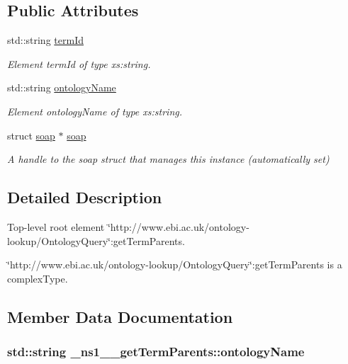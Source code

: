 \subsection*{Public Attributes}
\begin{DoxyCompactItemize}
\item 
std::string \hyperlink{class__ns1____getTermParents_aa94fee4393ebbdb785e2bfca3eca1cb7}{termId}
\begin{DoxyCompactList}\small\item\em Element termId of type xs:string. \end{DoxyCompactList}\item 
std::string \hyperlink{class__ns1____getTermParents_a19b0e7afdb896b93ce5eca2bca137493}{ontologyName}
\begin{DoxyCompactList}\small\item\em Element ontologyName of type xs:string. \end{DoxyCompactList}\item 
\hypertarget{class__ns1____getTermParents_aa76aa7a366274aa94453e75ba1f18197}{
struct \hyperlink{class__ns1____getTermParents_aa76aa7a366274aa94453e75ba1f18197}{soap} $\ast$ \hyperlink{class__ns1____getTermParents_aa76aa7a366274aa94453e75ba1f18197}{soap}}
\label{class__ns1____getTermParents_aa76aa7a366274aa94453e75ba1f18197}

\begin{DoxyCompactList}\small\item\em A handle to the soap struct that manages this instance (automatically set) \end{DoxyCompactList}\end{DoxyCompactItemize}


\subsection{Detailed Description}
Top-\/level root element \char`\"{}http://www.ebi.ac.uk/ontology-\/lookup/OntologyQuery\char`\"{}:getTermParents. 

\char`\"{}http://www.ebi.ac.uk/ontology-\/lookup/OntologyQuery\char`\"{}:getTermParents is a complexType. 

\subsection{Member Data Documentation}
\hypertarget{class__ns1____getTermParents_a19b0e7afdb896b93ce5eca2bca137493}{
\subsubsection[{ontologyName}]{\setlength{\rightskip}{0pt plus 5cm}std::string {\bf \_\-ns1\_\-\_\-getTermParents::ontologyName}}}
\label{class__ns1____getTermParents_a19b0e7afdb896b93ce5eca2bca137493}


